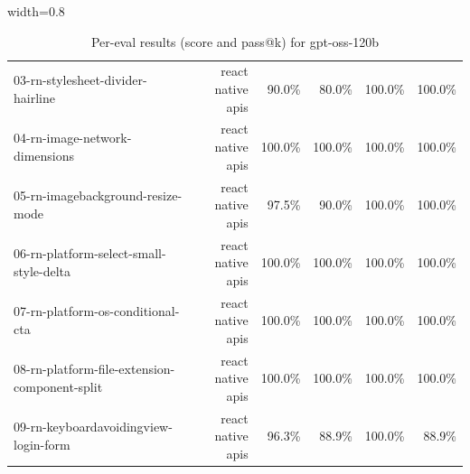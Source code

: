 \begin{table}[htbp]
\begin{adjustbox}{width=0.8\textwidth}
\begin{tabular}{lrrrrr}
03-rn-stylesheet-divider-hairline & react native apis & 90.0\% & 80.0\% & 100.0\% & 100.0\% \\
04-rn-image-network-dimensions & react native apis & 100.0\% & 100.0\% & 100.0\% & 100.0\% \\
05-rn-imagebackground-resize-mode & react native apis & 97.5\% & 90.0\% & 100.0\% & 100.0\% \\
06-rn-platform-select-small-style-delta & react native apis & 100.0\% & 100.0\% & 100.0\% & 100.0\% \\
07-rn-platform-os-conditional-cta & react native apis & 100.0\% & 100.0\% & 100.0\% & 100.0\% \\
08-rn-platform-file-extension-component-split & react native apis & 100.0\% & 100.0\% & 100.0\% & 100.0\% \\
09-rn-keyboardavoidingview-login-form & react native apis & 96.3\% & 88.9\% & 100.0\% & 88.9\% \\
\bottomrule
\end{tabular}
\end{adjustbox}
\caption{Per-eval results (score and pass@k) for gpt-oss-120b}
\end{table}
